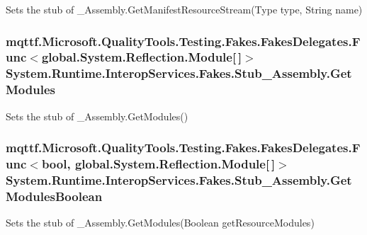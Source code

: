 Sets the stub of \-\_\-\-Assembly.\-Get\-Manifest\-Resource\-Stream(\-Type type, String name)

\hypertarget{class_system_1_1_runtime_1_1_interop_services_1_1_fakes_1_1_stub___assembly_a915884e5a2839e7832e07885bf8920a0}{
\subsubsection[{Get\-Modules}]{\setlength{\rightskip}{0pt plus 5cm}mqttf.\-Microsoft.\-Quality\-Tools.\-Testing.\-Fakes.\-Fakes\-Delegates.\-Func$<$global.\-System.\-Reflection.\-Module\mbox{[}$\,$\mbox{]}$>$ System.\-Runtime.\-Interop\-Services.\-Fakes.\-Stub\-\_\-\-Assembly.\-Get\-Modules}}\label{class_system_1_1_runtime_1_1_interop_services_1_1_fakes_1_1_stub___assembly_a915884e5a2839e7832e07885bf8920a0}


Sets the stub of \-\_\-\-Assembly.\-Get\-Modules()

\hypertarget{class_system_1_1_runtime_1_1_interop_services_1_1_fakes_1_1_stub___assembly_a1a2f8d82e2d5ab85f748abfe4fb5e3c0}{
\subsubsection[{Get\-Modules\-Boolean}]{\setlength{\rightskip}{0pt plus 5cm}mqttf.\-Microsoft.\-Quality\-Tools.\-Testing.\-Fakes.\-Fakes\-Delegates.\-Func$<$bool, global.\-System.\-Reflection.\-Module\mbox{[}$\,$\mbox{]}$>$ System.\-Runtime.\-Interop\-Services.\-Fakes.\-Stub\-\_\-\-Assembly.\-Get\-Modules\-Boolean}}\label{class_system_1_1_runtime_1_1_interop_services_1_1_fakes_1_1_stub___assembly_a1a2f8d82e2d5ab85f748abfe4fb5e3c0}


Sets the stub of \-\_\-\-Assembly.\-Get\-Modules(\-Boolean get\-Resource\-Modules)

